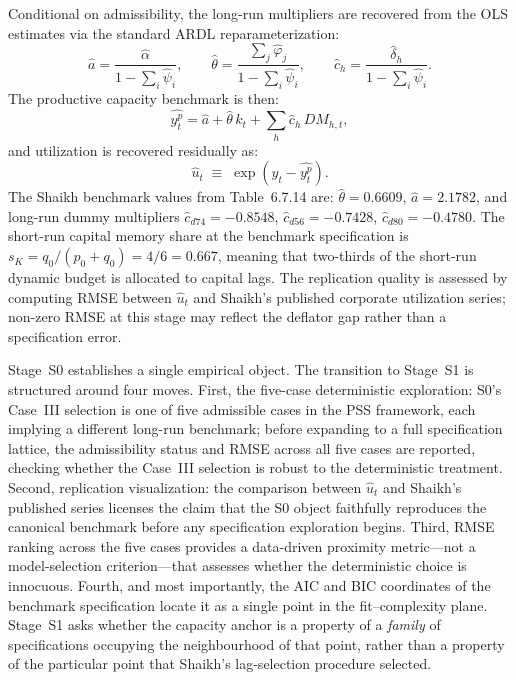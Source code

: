 \documentclass[11pt,a4paper]{article}
\begin{document}
Conditional on admissibility, the long-run multipliers are recovered from
the OLS estimates via the standard ARDL reparameterization:
%
\begin{equation}
	\label{eq:S0_lrmult}
	\hat{a} = \frac{\hat{\alpha}}{1 - \sum_i \hat{\psi}_i},
	\qquad
	\hat{\theta} = \frac{\sum_j \hat{\varphi}_j}{1 - \sum_i \hat{\psi}_i},
	\qquad
	\hat{c}_h = \frac{\hat{\delta}_h}{1 - \sum_i \hat{\psi}_i}.
\end{equation}
%
The productive capacity benchmark is then:
%
\begin{equation}
	\label{eq:S0_yp}
	\widehat{y_t^p}
	=
	\hat{a}
	+ \hat{\theta}\,k_t
	+ \sum_h \hat{c}_h\,DM_{h,t},
\end{equation}
%
and utilization is recovered residually as:
%
\begin{equation}
	\label{eq:S0_uhat}
	\widehat{u}_t
	\;\equiv\;
	\exp\!\left( y_t - \widehat{y_t^p} \right).
\end{equation}
%
The Shaikh benchmark values from Table~6.7.14 are: $\hat{\theta} = 0.6609$,
$\hat{a} = 2.1782$, and long-run dummy multipliers $\hat{c}_{d74} = -0.8548$,
$\hat{c}_{d56} = -0.7428$, $\hat{c}_{d80} = -0.4780$. The short-run capital
memory share at the benchmark specification is $s_K = q_0/(p_0 + q_0) =
4/6 = 0.667$, meaning that two-thirds of the short-run dynamic budget is
allocated to capital lags. The replication quality is assessed by computing
RMSE between $\widehat{u}_t$ and Shaikh's published corporate utilization
series; non-zero RMSE at this stage may reflect the deflator gap rather
than a specification error.


Stage~S0 establishes a single empirical object. The transition to Stage~S1
is structured around four moves. First, the five-case deterministic
exploration: S0's Case~III selection is one of five admissible cases in the
PSS framework, each implying a different long-run benchmark; before
expanding to a full specification lattice, the admissibility status and
RMSE across all five cases are reported, checking whether the Case~III
selection is robust to the deterministic treatment. Second, replication
visualization: the comparison between $\widehat{u}_t$ and Shaikh's
published series licenses the claim that the S0 object faithfully
reproduces the canonical benchmark before any specification exploration
begins. Third, RMSE ranking across the five cases provides a
data-driven proximity metric---not a model-selection criterion---that
assesses whether the deterministic choice is innocuous. Fourth, and most
importantly, the AIC and BIC coordinates of the benchmark specification
locate it as a single point in the fit--complexity plane. Stage~S1 asks
whether the capacity anchor is a property of a \emph{family} of
specifications occupying the neighbourhood of that point, rather than a
property of the particular point that Shaikh's lag-selection procedure
selected.
\end{document}
